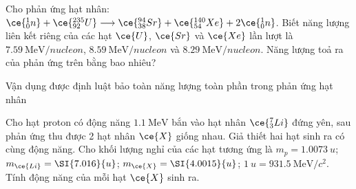 \begin{vd}
	Cho phản ứng hạt nhân: $\ce{^1_0n}+\ce{^{235}_{92}U}\longrightarrow \ce{^{94}_{38}Sr}+\ce{^{140}_{54}Xe}+2\ce{^1_0n}$. Biết năng lượng liên kết riêng của các hạt $\ce{U}$, $\ce{Sr}$ và $\ce{Xe}$ lần lượt là $\SI{7.59}{\mega\electronvolt/nucleon}$, $\SI{8.59}{\mega\electronvolt/nucleon}$ và $\SI{8.29}{\mega\electronvolt/nucleon}$. Năng lượng toả ra của phản ứng trên bằng bao nhiêu?
\end{vd}
\begin{dang}{Vận dụng được định luật bảo toàn năng lượng toàn phần trong phản ứng hạt nhân}
	\end{dang}
\begin{vd}
Cho hạt proton có động năng $\SI{1.1}{\mega\electronvolt}$ bắn vào hạt nhân $\ce{^7_3Li}$ đứng yên, sau phản ứng thu được 2 hạt nhân $\ce{X}$ giống nhau. Giả thiết hai hạt sinh ra có cùng động năng. Cho khối lượng nghỉ của các hạt tương ứng là $m_p=\SI{1.0073}{u}$; $m_{\ce{Li}}=\SI{7.016}{u}$; $m_{\ce{X}}=\SI{4.0015}{u}$; $\SI{1}{u}=\SI{931.5}{\mega\electronvolt/c^2}$. Tính động năng của mỗi hạt $\ce{X}$ sinh ra.
\end{vd}
